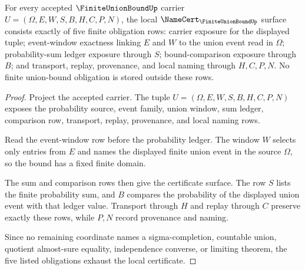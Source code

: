 \begin{theorem}
\label{thm:finite-union-bound-namecert-obligations}
For every accepted $\FiniteUnionBoundUp$ carrier $U=(\Omega,E,W,S,B,H,C,P,N)$, the local $\NameCert_{\FiniteUnionBoundUp}$ surface consists exactly of five finite obligation rows: carrier exposure for the displayed tuple; event-window exactness linking $E$ and $W$ to the union event read in $\Omega$; probability-sum ledger exposure through $S$; bound-comparison exposure through $B$; and transport, replay, provenance, and local naming through $H,C,P,N$. No finite union-bound obligation is stored outside these rows.
\end{theorem}
\begin{proof}
Project the accepted carrier. The tuple $U=(\Omega,E,W,S,B,H,C,P,N)$ exposes the probability source, event family, union window, sum ledger, comparison row, transport, replay, provenance, and local naming rows.

Read the event-window row before the probability ledger. The window $W$ selects only entries from $E$ and names the displayed finite union event in the source $\Omega$, so the bound has a fixed finite domain.

The sum and comparison rows then give the certificate surface. The row $S$ lists the finite probability sum, and $B$ compares the probability of the displayed union event with that ledger value. Transport through $H$ and replay through $C$ preserve exactly these rows, while $P,N$ record provenance and naming.

Since no remaining coordinate names a sigma-completion, countable union, quotient almost-sure equality, independence converse, or limiting theorem, the five listed obligations exhaust the local certificate.
\end{proof}


